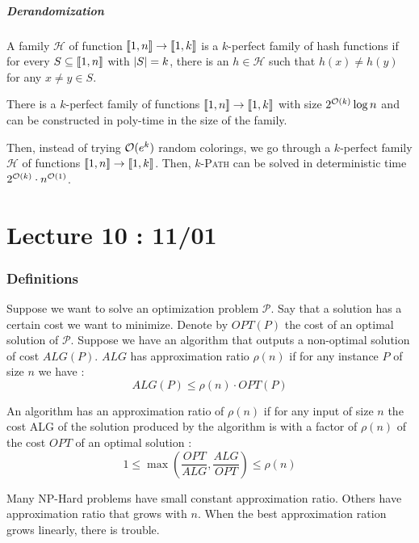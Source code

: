 \documentclass[12pt]{cours}
\begin{document}
\subsubsection{Derandomization}
\begin{definition}
    A family $\mathcal{H}$ of function $\left\llbracket 1, n\right\rrbracket \rightarrow \left\llbracket 1, k\right\rrbracket$ is a $k$-perfect family of hash functions if for every $S \subseteq \left\llbracket 1, n\right\rrbracket$ with $\left|S\right| = k$, there is an $h \in \mathcal{H}$ such that $h(x) \neq h(y)$ for any $x\neq y \in S$.
\end{definition}

\begin{theorem}
    There is a $k$-perfect family of functions $\left\llbracket 1, n\right\rrbracket \rightarrow \left\llbracket 1, k\right\rrbracket$ with size $2^{\mathcal{O}(k)}\log n$ and can be constructed in poly-time in the size of the family.
\end{theorem}

Then, instead of trying $\mathcal{O}(e^{k})$ random colorings, we go through a $k$-perfect family $\mathcal{H}$ of functions $\left\llbracket 1, n\right\rrbracket \rightarrow \left\llbracket 1, k\right\rrbracket$. Then, $k$-\textsc{Path} can be solved in deterministic time $2^{\mathcal{O}(k)}\cdot n^{\mathcal{O}(1)}$.


\part[Approximation Algorithm]{Lecture 10 : 11/01}
\section{Definitions}
Suppose we want to solve an optimization problem $\mathcal{P}$. Say that a solution has a certain cost we want to minimize. Denote by $OPT(P)$ the cost of an optimal solution of $\mathcal{P}$. Suppose we have an algorithm that outputs a non-optimal solution of cost $ALG(P)$. $ALG$ has approximation ratio $\rho(n)$ if for any instance $P$ of size $n$ we have : \[ ALG(P) \leq \rho(n)\cdot OPT(P)\]

\begin{definition}
    An algorithm has an approximation ratio of $\rho(n)$ if for any input of size $n$ the cost ALG of the solution produced by the algorithm is with a factor of $\rho(n)$ of the cost $OPT$ of an optimal solution :
    \[
        1 \leq \max \left(\frac{OPT}{ALG}, \frac{ALG}{OPT}\right) \leq \rho(n)
    \]
\end{definition}

Many NP-Hard problems  have small constant approximation ratio. Others have approximation ratio that grows with $n$. When the best approximation ration grows linearly, there is trouble.
\end{document}
